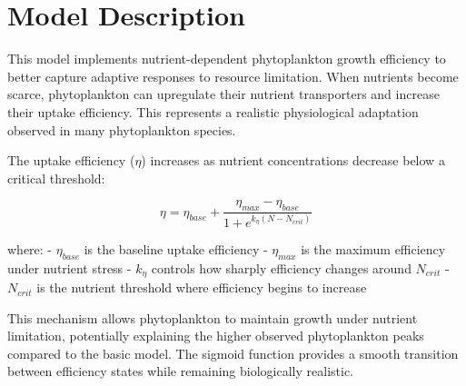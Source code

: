 \section{Model Description}

This model implements nutrient-dependent phytoplankton growth efficiency to better capture adaptive responses to resource limitation. When nutrients become scarce, phytoplankton can upregulate their nutrient transporters and increase their uptake efficiency. This represents a realistic physiological adaptation observed in many phytoplankton species.

The uptake efficiency ($\eta$) increases as nutrient concentrations decrease below a critical threshold:

\[ \eta = \eta_{base} + \frac{\eta_{max} - \eta_{base}}{1 + e^{k_\eta(N - N_{crit})}} \]

where:
- $\eta_{base}$ is the baseline uptake efficiency
- $\eta_{max}$ is the maximum efficiency under nutrient stress
- $k_\eta$ controls how sharply efficiency changes around $N_{crit}$
- $N_{crit}$ is the nutrient threshold where efficiency begins to increase

This mechanism allows phytoplankton to maintain growth under nutrient limitation, potentially explaining the higher observed phytoplankton peaks compared to the basic model. The sigmoid function provides a smooth transition between efficiency states while remaining biologically realistic.
